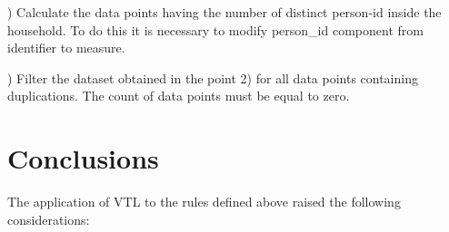 ) Calculate the data points having the number of distinct person-id inside the household. To do this it is necessary to modify person\_id component from identifier to measure. 

) Filter the dataset obtained in the point 2) for all data points containing duplications. The count of data points must be equal to zero. 


\begin{table}
\begin{center}
\footnotesize
{}
\caption{Translation of example viib)}
\centering
\label{Tab1-10}
\end{center}
\end{table}

\section{Conclusions}

\bigskip\noindent
The application of VTL to the rules defined above raised the following considerations:

